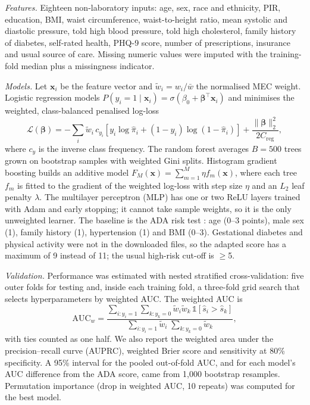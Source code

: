 \textit{Features.} Eighteen non-laboratory inputs: age, sex, race and ethnicity, PIR, education, BMI, waist circumference, waist-to-height ratio, mean systolic and diastolic pressure, told high blood pressure, told high cholesterol, family history of diabetes, self-rated health, PHQ-9 score, number of prescriptions, insurance and usual source of care. Missing numeric values were imputed with the training-fold median plus a missingness indicator.

\textit{Models.} Let $\mathbf{x}_i$ be the feature vector and $\tilde w_i=w_i/\bar w$ the normalised MEC weight. Logistic regression models $P(y_i=1\mid\mathbf{x}_i)=\sigma(\beta_0+\boldsymbol\beta^\top\mathbf{x}_i)$ and minimises the weighted, class-balanced penalised log-loss
\begin{equation}
\mathcal{L}(\boldsymbol\beta)=-\sum_i \tilde w_i\,c_{y_i}\!\left[y_i\log\hat\pi_i+(1-y_i)\log(1-\hat\pi_i)\right]+\frac{\lVert\boldsymbol\beta\rVert_2^2}{2C_{\mathrm{reg}}},
\end{equation}
where $c_{y}$ is the inverse class frequency. The random forest averages $B=500$ trees grown on bootstrap samples with weighted Gini splits. Histogram gradient boosting builds an additive model $F_M(\mathbf{x})=\sum_{m=1}^{M}\eta f_m(\mathbf{x})$, where each tree $f_m$ is fitted to the gradient of the weighted log-loss with step size $\eta$ and an $L_2$ leaf penalty $\lambda$. The multilayer perceptron (MLP) has one or two ReLU layers trained with Adam and early stopping; it cannot take sample weights, so it is the only unweighted learner. The baseline is the ADA risk test \cite{bang2009}: age (0--3 points), male sex (1), family history (1), hypertension (1) and BMI (0--3). Gestational diabetes and physical activity were not in the downloaded files, so the adapted score has a maximum of 9 instead of 11; the usual high-risk cut-off is $\geq$5.

\textit{Validation.} Performance was estimated with nested stratified cross-validation: five outer folds for testing and, inside each training fold, a three-fold grid search that selects hyperparameters by weighted AUC. The weighted AUC is
\begin{equation}
\mathrm{AUC}_w=\frac{\sum_{i:y_i=1}\sum_{k:y_k=0}\tilde w_i\tilde w_k\,\mathbb{1}[\hat s_i>\hat s_k]}{\sum_{i:y_i=1}\tilde w_i\;\sum_{k:y_k=0}\tilde w_k},
\end{equation}
with ties counted as one half. We also report the weighted area under the precision--recall curve (AUPRC), weighted Brier score and sensitivity at 80\% specificity. A 95\% interval for the pooled out-of-fold AUC, and for each model's AUC difference from the ADA score, came from 1,000 bootstrap resamples. Permutation importance (drop in weighted AUC, 10 repeats) was computed for the best model.

